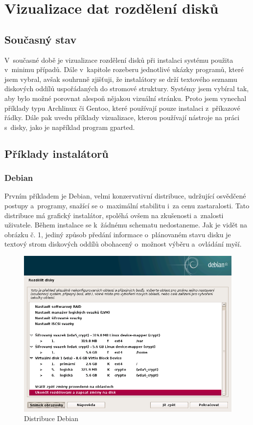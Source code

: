 \documentclass{report}
\begin{document}
\chapter{Vizualizace dat rozdělení disků}
\section{Současný stav}

V~současné době je vizualizace rozdělení disků při instalaci systému použita v~minimu případů. Dále v~kapitole rozeberu jednotlivé ukázky programů, které jsem vybral, avšak souhrnně zjišťuji, 
že instalátory se drží textového seznamu diskových oddílů uspořádaných do stromové struktury. Systémy jsem vybíral tak, aby bylo možné porovnat alespoň nějakou vizuální stránku. Proto jsem vynechal
příklady typu Archlinux či Gentoo, které používají pouze instalaci z~příkazové řádky.  Dále pak uvedu příklady vizualizace, kterou používají nástroje na práci s~disky, jako je 
například program gparted.

\section{Příklady instalátorů}

\subsection{Debian}

Prvním příkladem je Debian, velmi konzervativní distribuce, udržující osvědčené postupy a~programy, snažící se o~maximální stabilitu i~za cenu zastaralosti. 
Tato distribuce má grafický instalátor, spoléhá ovšem na zkušenosti a~znalosti uživatele. Během instalace se k~žádnému schematu nedostaneme. Jak je vidět na obrázku č. 1, jediný způsob předání 
informace o~plánovaném stavu disku je textový strom diskových oddílů obohacený o~možnost výběru a~ovládání myší.

\begin{figure}[hb]
\caption{Distribuce Debian}
\centering
\includegraphics[width=.8\columnwidth]{pics/debian1.png}
\end{figure}
\end{document}

